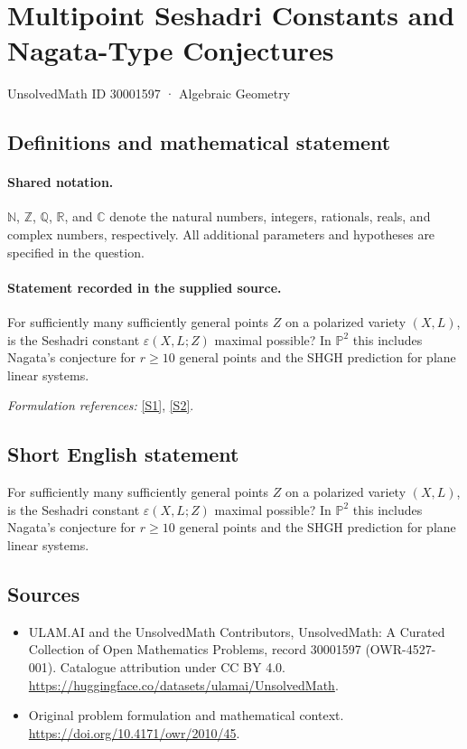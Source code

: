 \documentclass[11pt]{article}
\newcommand{\sref}[2]{\hyperlink{source:#1:#2}{[S#2]}}
\begin{document}
\setcounter{section}{30001596}
\section{Multipoint Seshadri Constants and Nagata-Type Conjectures}\label{30001597}
{\small UnsolvedMath ID 30001597 · Algebraic Geometry}
\subsection{Definitions and mathematical statement}

\paragraph{Shared notation.}$\mathbb N$, $\mathbb Z$, $\mathbb Q$, $\mathbb R$, and $\mathbb C$ denote the natural numbers, integers, rationals, reals, and complex numbers, respectively. All additional parameters and hypotheses are specified in the question.


\paragraph{Statement recorded in the supplied source.}
For sufficiently many sufficiently general points $Z$ on a polarized variety $(X,L)$, is the Seshadri constant $\varepsilon(X,L;Z)$ maximal possible? In $\mathbb{P}^{2}$ this includes Nagata's conjecture for $r\geq10$ general points and the SHGH prediction for plane linear systems.
\par\smallskip\textit{Formulation references:} \sref{30001597}{1}, \sref{30001597}{2}.
\subsection{Short English statement}
For sufficiently many sufficiently general points $Z$ on a polarized variety $(X,L)$, is the Seshadri constant $\varepsilon(X,L;Z)$ maximal possible? In $\mathbb{P}^{2}$ this includes Nagata's conjecture for $r\geq10$ general points and the SHGH prediction for plane linear systems.
\subsection{Sources}
\begin{itemize}
\item[\hypertarget{source:30001597:1}{S1}] ULAM.AI and the UnsolvedMath Contributors, UnsolvedMath: A Curated Collection of Open Mathematics Problems, record 30001597 (OWR-4527-001). Catalogue attribution under CC BY 4.0.
\url{https://huggingface.co/datasets/ulamai/UnsolvedMath}.
\item[\hypertarget{source:30001597:2}{S2}] Original problem formulation and mathematical context.
\url{https://doi.org/10.4171/owr/2010/45}.
\end{itemize}
\label{end:30001597}
\end{document}
